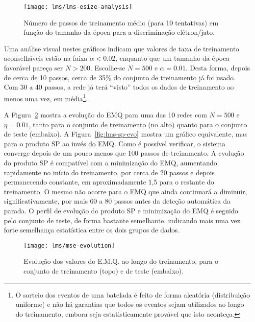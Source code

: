 \begin{figure}
\begin{center}
\texttt{[image: lms/lms-esize-analysis]}
\end{center}
\caption{Número de passos de treinamento médio (para 10 tentativas) em função
do tamanho da época para a discriminação elétron/jato.}
\label{fig:lms-esize-analysis}
\end{figure}

Uma análise visual nestes gráficos indicam que valores de taxa de treinamento
aconselháveis estão na faixa $\alpha < 0.02$, enquanto que um tamanho da época
favorável pareça ser $N > 200$. Escolhe-se $N = 500$ e $\alpha = 0.01$. Desta
forma, depois de cerca de 10 passos, cerca de 35\% do conjunto de treinamento
já foi usado. Com 30 a 40 passos, a rede já terá ``visto'' todos os dados de
treinamento ao menos uma vez, em média\footnote{O sorteio dos eventos de uma
batelada é feito de forma aleatória (distribuição uniforme) e não há garantias
que todos os eventos sejam utilizados ao longo do treinamento, embora seja
estatisticamente provável que isto aconteça.}.

A Figura~\ref{fig:lms-mse-evo} mostra a evolução do EMQ para uma das 10 redes
com $N = 500$ e $\eta = 0.01$, tanto para o conjunto de treinamento (no alto)
quanto para o conjunto de teste (embaixo). A Figura~\ref{fig:lms-sp-evo}
mostra um gráfico equivalente, mas para o produto SP ao invés do EMQ. Como é
possível verificar, o sistema converge depois de um pouco menos que 100 passos
de treinamento. A evolução do produto SP é compatível com a minimização do EMQ,
aumentando rapidamente no início do treinamento, por cerca de 20 passos e
depois permanecendo constante, em aproximadamente 1,5 para o restante do
treinamento. O mesmo não ocorre para o EMQ que ainda continuará a diminuir,
significativamente, por mais 60 a 80 passos antes da deteção automática da
parada. O perfil de evolução do produto SP e minimização do EMQ é seguido pelo
conjunto de teste, de forma bastante semelhante, indicando mais uma vez forte
semelhança estatística entre os dois grupos de dados.

\begin{figure}
\begin{center}
\texttt{[image: lms/mse-evolution]}
\end{center}
\caption{Evolução dos valores do E.M.Q. ao longo do treinamento, para o
conjunto de treinamento (topo) e de teste (embaixo).}
\label{fig:lms-mse-evo}
\end{figure}

